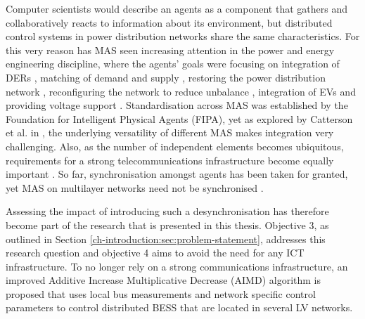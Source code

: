 Computer scientists would describe an agents as a component that gathers and collaboratively reacts to information about its environment, but distributed control systems in power distribution networks share the same characteristics.
For this very reason has MAS seen increasing attention in the power and energy engineering discipline, where the agents' goals were focusing on integration of DERs \cite{Al-Hinai2004, Dimeas2005, Vasirani2013, Dou2017, Gomez-Sanz2014}, matching of demand and supply \cite{Kok2005}, restoring the power distribution network \cite{Li2012}, reconfiguring the network to reduce unbalance \cite{Ding2016}, integration of EVs \cite{Lopez2011, Karfopoulos2013, Ramachandran2013, GrauUnda2014} and providing voltage support \cite{Baran2007}.
Standardisation across MAS was established by the Foundation for Intelligent Physical Agents (FIPA), yet as explored by Catterson et al. in \cite{Catterson2005}, the underlying versatility of different MAS makes integration very challenging.
Also, as the number of independent elements becomes ubiquitous, requirements for a strong telecommunications infrastructure become equally important \cite{Hatziargyriou2015}.
So far, synchronisation amongst agents has been taken for granted, yet MAS on multilayer networks need not be synchronised \cite{He2017}.

Assessing the impact of introducing such a desynchronisation has therefore become part of the research that is presented in this thesis.
Objective 3, as outlined in Section \ref{ch-introduction:sec:problem-statement}, addresses this research question and objective 4 aims to avoid the need for any ICT infrastructure.
To no longer rely on a strong communications infrastructure, an improved Additive Increase Multiplicative Decrease (AIMD) algorithm is proposed that uses local bus measurements and network specific control parameters to control distributed BESS that are located in several LV networks.


